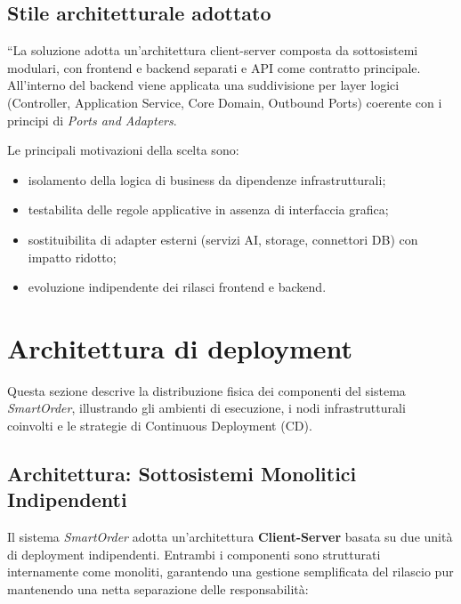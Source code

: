 \documentclass[a4paper, 11pt, oneside]{scrartcl}
\begin{document}
\subsection{Stile architetturale adottato}
“La soluzione adotta un'architettura client-server composta da sottosistemi modulari, con frontend e backend separati e API come contratto principale.
All'interno del backend viene applicata una suddivisione per layer logici (Controller, Application Service, Core Domain, Outbound Ports) coerente con i principi di \textit{Ports and Adapters}.

Le principali motivazioni della scelta sono:
\begin{itemize}
    \item isolamento della logica di business da dipendenze infrastrutturali;
    \item testabilita delle regole applicative in assenza di interfaccia grafica;
    \item sostituibilita di adapter esterni (servizi AI, storage, connettori DB) con impatto ridotto;
    \item evoluzione indipendente dei rilasci frontend e backend.
\end{itemize}

\newpage
\section{Architettura di deployment}

Questa sezione descrive la distribuzione fisica dei componenti del sistema \textit{SmartOrder}, illustrando gli ambienti di esecuzione, i nodi
     infrastrutturali coinvolti e le strategie di Continuous Deployment (CD).

\subsection{Architettura: Sottosistemi Monolitici Indipendenti}
Il sistema \textit{SmartOrder} adotta un'architettura \textbf{Client-Server} basata su due unità di deployment indipendenti. Entrambi i componenti
      sono strutturati internamente come monoliti, garantendo una gestione semplificata del rilascio pur mantenendo una netta separazione delle
      responsabilità:
\end{document}

